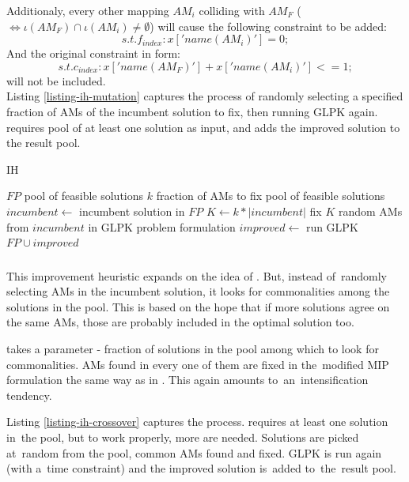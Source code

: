Additionaly, every other mapping $AM_i$ colliding with $AM_F$ ($\iff \iota(AM_F) \cap \iota(AM_i) \neq \emptyset$) will cause the following constraint to be added:
\[s.t. f_{index}: x['name(AM_i)'] = 0;\]
And the original constraint in form:
\[s.t. c_{index}: x['name(AM_F)'] + x['name(AM_i)'] <= 1;\]
will not be included.\\

Listing \ref{listing-ih-mutation} captures the process of randomly selecting a specified fraction of AMs of the incumbent solution to fix, then running GLPK again.  requires pool of at least one solution as input, and adds the improved solution to the result pool.

\begin{algorithm}
\caption{ IH}
\label{listing-ih-mutation}
\begin{algorithmic}
\REQUIRE $FP$ pool of feasible solutions
\REQUIRE $k$ fraction of AMs to fix
\ENSURE pool of feasible solutions
\STATE $incumbent \gets $ incumbent solution in $FP$
\STATE $K \gets k * |incumbent|$
\STATE fix $K$ random AMs from $incumbent$ in GLPK problem formulation
\STATE $improved \gets $ run GLPK
\RETURN $FP \cup improved$
\end{algorithmic}
\end{algorithm}

\subsubsection{}

This improvement heuristic expands on the idea of . But, instead of~randomly selecting AMs in the incumbent solution, it looks for commonalities among the solutions in the pool. This is based on the hope that if more solutions agree on the same AMs, those are probably included in the optimal solution too.

 takes a parameter - fraction of solutions in the pool among which to look for commonalities. AMs found in every one of them are fixed in the~modified MIP formulation the same way as in . This again amounts to~an~intensification tendency.

Listing \ref{listing-ih-crossover} captures the process.  requires at least one solution in~the pool, but to work properly, more are needed. Solutions are picked at~random from the pool, common AMs found and fixed. GLPK is run again (with a~time constraint) and the improved solution is~added to~the~result pool.

